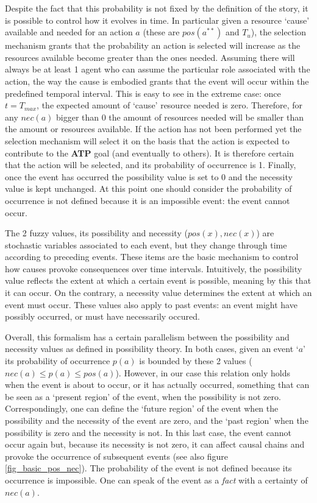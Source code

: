 \documentclass[
		twoside,openright,titlepage,numbers=noenddot,manychapters,
		headinclude,%
                footinclude=false,cleardoublepage=empty,
                BCOR=5mm,
		fontsize=11pt, %
                 enabledeprecatedfontcommands]{scrreprt}
\begin{document}
Despite the fact that this probability is not fixed by the definition of the story, it is possible to control how it evolves in time. In particular given a resource ‘cause’ available and needed for an action $a$ (these are $pos(a^{**})$ and $T_u$), the selection mechanism grants that the probability an action is selected will increase as the resources available become greater than the ones needed. 
Assuming there will always be at least 1 agent who can assume the particular role associated with the action, the way the cause is embodied grants that the event will occur within the predefined temporal interval. This is easy to see in the extreme case: once $t=T_{max}$, the expected amount of ‘cause’ resource needed is zero. Therefore, for any $nec(a)$ bigger than 0 the amount of resources needed will be smaller than the amount or resources available. If the action has not been performed yet the selection mechanism will select it on the basis that the action is expected to contribute to the \textbf{ATP} goal (and eventually to others). It is therefore certain that the action will be selected, and its probability of occurrence is 1. Finally, once the event has occurred the possibility value is set to 0 and the necessity value is kept unchanged. At this point one should consider the probability of occurrence is not defined because it is an impossible event: the event cannot occur.

The 2 fuzzy values, its possibility and necessity ($pos(x), nec(x)$) are stochastic variables associated to each event, but they change through time according to preceding events. These items are the basic mechanism to control how causes provoke consequences over time intervals.  Intuitively,  the possibility value reflects the extent at which a certain event is possible, meaning by this that it can occur. On the contrary, a necessity value determines the extent at which an event must occur. These values also apply to past events: an event might have possibly occurred, or must have necessarily occured.

Overall, this formalism has a certain parallelism between the possibility and necessity values as defined in possibility theory. In both cases, given an event ‘$a$’ its probability of occurrence $p(a)$ is bounded by these 2 values ($nec(a) \leq p(a) \leq pos(a)$). However, in our case this relation only holds when the event is about to occur, or it has actually occurred, something that can be seen as a ‘present region’ of the event, when the possibility is not zero. 
Correspondingly, one can define the ‘future region’ of the event when the possibility and the necessity of the event are zero, and the ‘past region’ when the possibility is zero and the necessity is not. In this last case, the event cannot occur again but, because its necessity is not zero, it can affect causal chains and provoke the occurrence of subsequent events (see also figure \ref{fig_basic_pos_nec}). The probability of the event is not defined because its occurrence is impossible. One can speak of the event as a \emph{fact} with a certainty of $nec(a)$.
\end{document}
